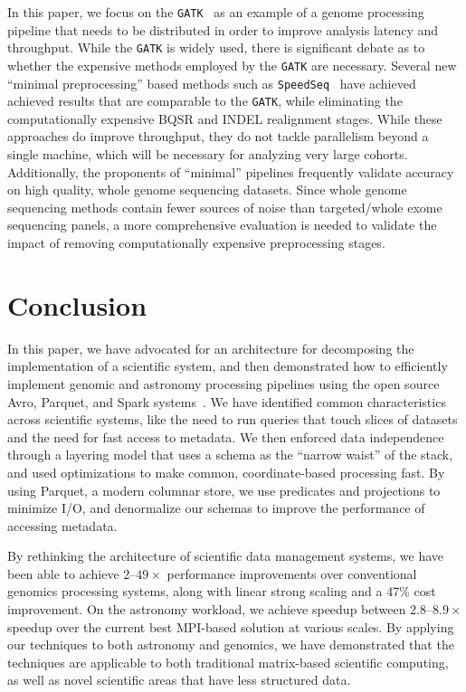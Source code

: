 \documentclass{acm_proc_article-sp}
\begin{document}
In this paper, we focus on the \texttt{GATK}~\cite{depristo11} as an example of a genome processing pipeline that
needs to be distributed in order to improve analysis latency and throughput. While the \texttt{GATK} is widely used,
there is significant debate as to whether the expensive methods employed by the \texttt{GATK} are necessary. Several
new ``minimal preprocessing'' based methods such as \texttt{SpeedSeq}~\cite{chiang14} have achieved achieved results
that are comparable to the \texttt{GATK}, while eliminating the computationally expensive BQSR and INDEL realignment
stages. While these approaches do improve throughput, they do not tackle parallelism beyond a single machine, which
will be necessary for analyzing very large cohorts. Additionally, the proponents of ``minimal'' pipelines frequently validate
accuracy on high quality, whole genome sequencing datasets. Since whole genome sequencing methods contain fewer
sources of noise than targeted/whole exome sequencing panels, a more comprehensive evaluation is needed
to validate the impact of removing computationally expensive preprocessing stages.

\section{Conclusion}
\label{sec:conclusion}

In this paper, we have advocated for an architecture for decomposing the implementation of a scientific
system, and then demonstrated how to efficiently implement genomic and astronomy processing pipelines using
the open source Avro, Parquet, and Spark systems~\cite{avro, parquet, zaharia10}. We have identified common
characteristics across scientific systems, like the need to run queries that touch slices of datasets and the need
for fast access to metadata. We then enforced data independence through a layering model that uses a schema
as the ``narrow waist'' of the stack, and used optimizations to make common, coordinate-based processing
fast. By using Parquet, a modern columnar store, we use predicates and projections to minimize I/O, and
denormalize our schemas to improve the performance of accessing metadata.

By rethinking the architecture of scientific data management systems, we have been able to achieve
2--$49\times$ performance improvements over conventional genomics processing systems, along with linear
strong scaling and a 47\% cost improvement. On the astronomy workload, we achieve speedup between
2.8--$8.9\times$ speedup over the current best MPI-based solution at various scales. By applying our techniques
to both astronomy and genomics, we have demonstrated that the techniques are applicable to both traditional
matrix-based scientific computing, as well as novel scientific areas that have less structured data.
\end{document}
